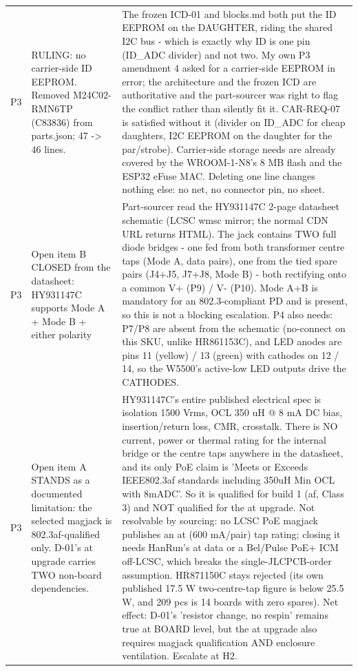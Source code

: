 \documentclass[11pt,a4paper]{article}
\begin{document}
{\begin{longtable}{lp{5.2cm}p{7.2cm}}
P3 & RULING: no carrier-side ID EEPROM. Removed M24C02-RMN6TP (C83836) from parts.json; 47 -\textgreater{} 46 lines. & The frozen ICD-01 and blocks.md both put the ID EEPROM on the DAUGHTER, riding the shared I2C bus - which is exactly why ID is one pin (ID\_ADC divider) and not two. My own P3 amendment 4 asked for a carrier-side EEPROM in error; the architecture and the frozen ICD are authoritative and the part-sourcer was right to flag the conflict rather than silently fit it. CAR-REQ-07 is satisfied without it (divider on ID\_ADC for cheap daughters, I2C EEPROM on the daughter for the par/strobe). Carrier-side storage needs are already covered by the WROOM-1-N8's 8 MB flash and the ESP32 eFuse MAC. Deleting one line changes nothing else: no net, no connector pin, no sheet. \\
P3 & Open item B CLOSED from the datasheet: HY931147C supports Mode A + Mode B + either polarity & Part-sourcer read the HY931147C 2-page datasheet schematic (LCSC wmsc mirror; the normal CDN URL returns HTML). The jack contains TWO full diode bridges - one fed from both transformer centre taps (Mode A, data pairs), one from the tied spare pairs (J4+J5, J7+J8, Mode B) - both rectifying onto a common V+ (P9) / V- (P10). Mode A+B is mandatory for an 802.3-compliant PD and is present, so this is not a blocking escalation. P4 also needs: P7/P8 are absent from the schematic (no-connect on this SKU, unlike HR861153C), and LED anodes are pins 11 (yellow) / 13 (green) with cathodes on 12 / 14, so the W5500's active-low LED outputs drive the CATHODES. \\
P3 & Open item A STANDS as a documented limitation: the selected magjack is 802.3af-qualified only. D-01's at upgrade carries TWO non-board dependencies. & HY931147C's entire published electrical spec is isolation 1500 Vrms, OCL 350 uH @ 8 mA DC bias, insertion/return loss, CMR, crosstalk. There is NO current, power or thermal rating for the internal bridge or the centre taps anywhere in the datasheet, and its only PoE claim is 'Meets or Exceeds IEEE802.3af standards including 350uH Min OCL with 8mADC'. So it is qualified for build 1 (af, Class 3) and NOT qualified for the at upgrade. Not resolvable by sourcing: no LCSC PoE magjack publishes an at (600 mA/pair) tap rating; closing it needs HanRun's at data or a Bel/Pulse PoE+ ICM off-LCSC, which breaks the single-JLCPCB-order assumption. HR871150C stays rejected (its own published 17.5 W two-centre-tap figure is below 25.5 W, and 209 pcs is 14 boards with zero spares). Net effect: D-01's 'resistor change, no respin' remains true at BOARD level, but the at upgrade also requires magjack qualification AND enclosure ventilation. Escalate at H2. \\

\end{longtable}}
\end{document}
